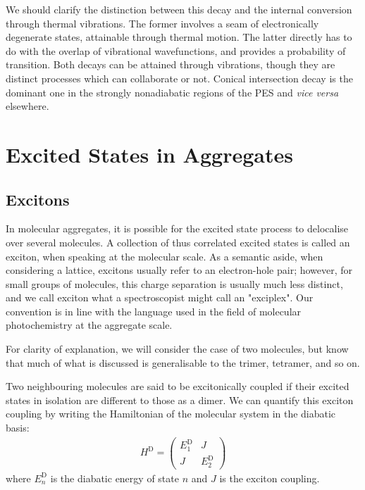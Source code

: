 We should clarify the distinction between this decay and the internal conversion through thermal vibrations. The former involves a seam of electronically degenerate states, attainable through thermal motion. The latter directly has to do with the overlap of vibrational wavefunctions, and provides a probability of transition. Both decays can be attained through vibrations, though they are distinct processes which can collaborate or not. Conical intersection decay is the dominant one in the strongly nonadiabatic regions of the PES and \textit{vice versa} elsewhere.\cite{Escudero2019}

\section{Excited States in Aggregates}
\subsection{Excitons}
In molecular aggregates, it is possible for the excited state process to delocalise over several molecules. A collection of thus correlated excited states is called an exciton, when speaking at the molecular scale. As a semantic aside, when considering a lattice, excitons usually refer to an electron-hole pair; however, for small groups of molecules, this charge separation is usually much less distinct, and we call exciton what a spectroscopist might call an "exciplex". Our convention is in line with the language used in the field of molecular photochemistry at the aggregate scale.\cite{Arag2015,Fornari2017,Jurinovich2018}

For clarity of explanation, we will consider the case of two molecules, but know that much of what is discussed is generalisable to the trimer, tetramer, and so on.

Two neighbouring molecules are said to be excitonically coupled if their excited states in isolation are different to those as a dimer. We can quantify this exciton coupling by writing the Hamiltonian of the molecular system in the diabatic basis:
\begin{gather}
    H^{\text{D}} = 
    \begin{pmatrix}
    E^{\text{D}}_1 & J\\
    J & E^{\text{D}}_2
    \end{pmatrix}
\end{gather}
where $E^{\text{D}}_n$ is the diabatic energy of state $n$ and $J$ is the exciton coupling.

